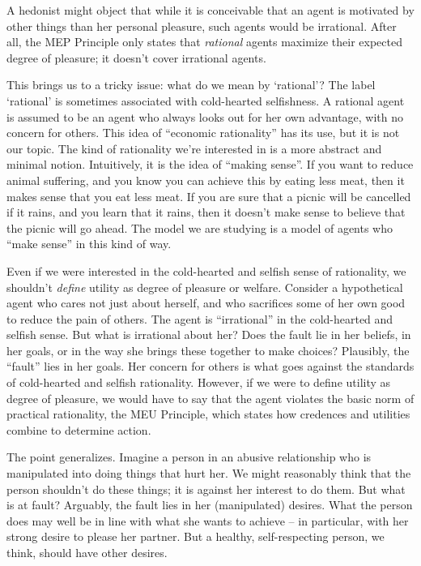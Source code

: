 
A hedonist might object that while it is conceivable that an agent is
motivated by other things than her personal pleasure, such agents
would be irrational. After all, the MEP Principle only states that
\emph{rational} agents maximize their expected degree of pleasure; it
doesn't cover irrational agents.

This brings us to a tricky issue: what do we mean by `rational'? The
label `rational' is sometimes associated with cold-hearted
selfishness. A rational agent is assumed to be an agent who always
looks out for her own advantage, with no concern for others. This idea
of ``economic rationality'' has its use, but it is not our topic. The
kind of rationality we're interested in is a more abstract and minimal
notion. Intuitively, it is the idea of ``making sense''. If you want
to reduce animal suffering, and you know you can achieve this by
eating less meat, then it makes sense that you eat less meat. If you
are sure that a picnic will be cancelled if it rains, and you learn
that it rains, then it doesn't make sense to believe that the picnic
will go ahead. The model we are studying is a model of agents who
``make sense'' in this kind of way.

Even if we were interested in the cold-hearted and selfish sense of
rationality, we shouldn't \emph{define} utility as degree of pleasure or
welfare. Consider a hypothetical agent who cares not just about
herself, and who sacrifices some of her own good to reduce the pain of
others. The agent is ``irrational'' in the cold-hearted and selfish
sense. But what is irrational about her? Does the fault lie in her
beliefs, in her goals, or in the way she brings these together to make
choices? Plausibly, the ``fault'' lies in her goals. Her concern for
others is what goes against the standards of cold-hearted and selfish
rationality. However, if we were to define utility as degree of
pleasure, we would have to say that the agent violates the basic norm
of practical rationality, the MEU Principle, which states how
credences and utilities combine to determine action.

The point generalizes. Imagine a person in an abusive relationship who
is manipulated into doing things that hurt her. We might reasonably
think that the person shouldn't do these things; it is against her
interest to do them. But what is at fault? Arguably, the fault lies in
her (manipulated) desires. What the person does may well be in line
with what she wants to achieve -- in particular, with her strong
desire to please her partner. But a healthy, self-respecting person,
we think, should have other desires.

